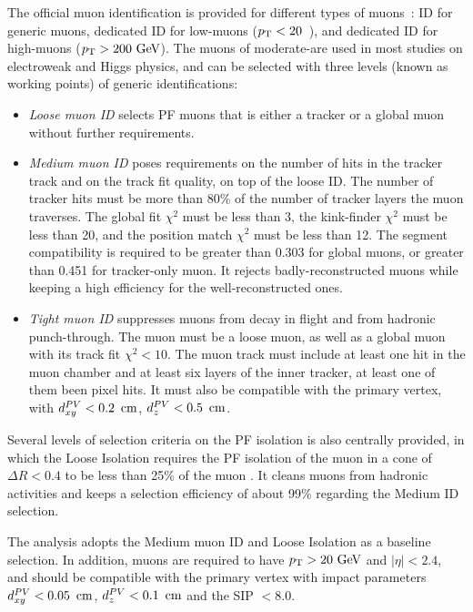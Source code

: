 The official muon identification is provided for different types of muons~\cite{Sirunyan_2018}: 
ID for generic muons, dedicated ID for low-\pt muons ($p_{\mathrm{T}} < 20$~\GeV), and dedicated ID for high-\pt muons ($p_{\mathrm{T}} > 200~\mbox{GeV}$).
The muons of moderate-\pt are used in most studies on electroweak and Higgs physics, 
and can be selected with three levels (known as working points) of generic identifications:
\begin{itemize}
    \item \textit{Loose muon ID}
          selects PF muons that is either a tracker or a global muon without further requirements.
    \item \textit{Medium muon ID}
          poses requirements on the number of hits in the tracker track and on the track fit quality, on top of the loose ID.
          The number of tracker hits must be more than 80\% of the number of tracker layers the muon traverses.
          The global fit $\chi^{2}$ must be less than 3, the kink-finder $\chi^{2}$ must be less than 20, 
          and the position match $\chi^{2}$ must be less than 12.
          The segment compatibility is required to be greater than 0.303 for global muons, or greater than 0.451 for tracker-only muon.
          It rejects badly-reconstructed muons while keeping a high efficiency for the well-reconstructed ones.
    \item \textit{Tight muon ID}
          suppresses muons from decay in flight and from hadronic punch-through.
          The muon must be a loose muon, as well as a global muon with its track fit $\chi^{2} < 10$.
          The muon track must include at least one hit in the muon chamber and at least six layers of the inner tracker, at least one of them been pixel hits.
          It must also be compatible with the primary vertex, with $d^{PV}_{xy} < 0.2~\,\text{cm}$, $d^{PV}_{z} < 0.5~\,\text{cm}$.
\end{itemize}

Several levels of selection criteria on the PF isolation is also centrally provided, 
in which the Loose Isolation requires the PF isolation of the muon in a cone of $\Delta{}R < 0.4$ to be less than 25\% of the muon \pt.
It cleans muons from hadronic activities and keeps a selection efficiency of about 99\% regarding the Medium ID selection.

The \hmm analysis adopts the Medium muon ID and Loose Isolation as a baseline selection.
In addition, muons are required to have $p_{\mathrm{T}} > 20~\mbox{GeV}$ and $|\eta| < 2.4$,
and should be compatible with the primary vertex with impact parameters
$d^{PV}_{xy} < 0.05~\,\text{cm}$, $d^{PV}_{z} < 0.1~\,\text{cm}$ and the SIP $< 8.0$. 

